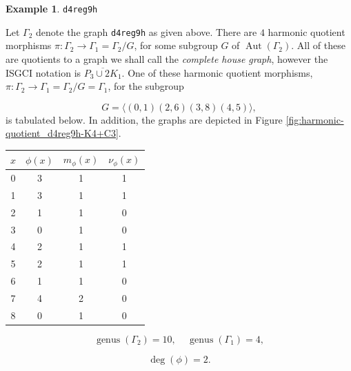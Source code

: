 \documentclass[12pt,letterpaper]{article}
\theoremstyle{definition}
\newtheorem{example}[theorem]{Example}
\DeclareMathOperator{\Aut}{Aut}
\DeclareMathOperator{\genus}{genus}
\begin{document}
\begin{example}%
\label{example:d4reg9h}
 {\tt d4reg9h}\newline
{\rm  
Let $\Gamma_2$ denote the graph {\tt d4reg9h} as given above.
There are $4$ harmonic quotient morphisms
$\pi: \Gamma_2\to \Gamma_1=\Gamma_2/G$,
for some subgroup $G$ of $\Aut(\Gamma_2)$.
All of these are quotients to a graph we shall call
the {\it complete house graph}, however the ISGCI notation is
$\overline{P_3\cup 2K_1}$. 
One of these harmonic quotient morphisms,
$\pi: \Gamma_2\to \Gamma_1=\Gamma_2/G=\Gamma_1$,
for the subgroup

\[
G = \langle (0,1)(2,6)(3,8)(4,5) \rangle,
\]
is tabulated below.
In addition, the graphs are depicted
in Figure \ref{fig:harmonic-quotient_d4reg9h-K4+C3}.

\begin{center}
\begin{tabular}{c|c|c|c}  
  $x$ & $\phi(x)$ & $m_\phi(x)$ & $\nu_\phi(x)$ \\ \hline
  0   &    3   &        1         &  1   \\ 
  1   &    3   &        1         &  1  \\ 
  2   &    1   &        1         &  0  \\ 
  3   &    0   &        1         &  0  \\ 
  4   &    2   &        1         &  1   \\
  5   &    2   &        1         &  1   \\
  6   &    1   &        1         &  0   \\
  7   &    4   &        2         &  0   \\
  8   &    0   &        1         &  0   \\ 
\end{tabular}
\end{center}

\[
  \genus(\Gamma_2) =10,\ \ \ \ \
  \genus(\Gamma_1) =4,
\]

\[
\deg(\phi) =2.
\]

}
\end{example}
\end{document}
